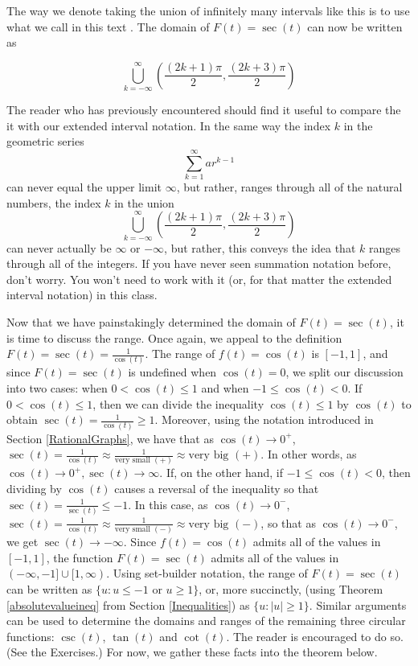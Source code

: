 The way we denote taking the union of infinitely many intervals like this is to use what we call in this text .  The domain of $F(t) = \sec(t)$ can now be written as

\[ \bigcup_{k = -\infty}^{\infty} \left( \frac{(2k+1)\pi}{2}, \frac{(2k+3) \pi}{2} \right) \]

\label{extendedinterval}

The reader who has previously encountered  should find it useful to compare the it with our extended interval notation.  In the same way the index $k$ in the geometric series 
\[\displaystyle{\sum_{k = 1}^{\infty} a r^{k-1}}\] 
can never equal the upper limit $\infty$, but rather, ranges through all of the natural numbers, the index $k$ in the union \[\displaystyle{\bigcup_{k = -\infty}^{\infty} \left( \frac{(2k+1)\pi}{2}, \frac{(2k+3) \pi}{2} \right)}\] can never actually be $\infty$ or $-\infty$, but rather, this conveys the idea that $k$ ranges through all of the integers. If you have never seen summation notation before, don't worry. You won't need to work with it (or, for that matter the extended interval notation) in this class.  

Now that we have painstakingly determined the domain of $F(t) = \sec(t)$, it is time to discuss the range.  Once again, we appeal to the definition $F(t) = \sec(t) = \frac{1}{\cos(t)}$.  The range of $f(t) = \cos(t)$ is $[-1,1]$, and since $F(t) = \sec(t)$ is  undefined when $\cos(t) = 0$, we split our discussion into two cases: when $0 < \cos(t) \leq 1$ and when $-1 \leq \cos(t) < 0$.  If $0 < \cos(t) \leq 1$, then we can divide the inequality $\cos(t) \leq 1$ by  $\cos(t)$ to obtain  $\sec(t) = \frac{1}{\cos(t)} \geq 1$.  Moreover, using the notation introduced in Section \ref{RationalGraphs}, we have that as  $\cos(t) \rightarrow 0^{+}$, $\sec(t)  = \frac{1}{\cos(t)} \approx \frac{1}{\text{very small $(+)$}} \approx \text{very big $(+)$}$.  In other words, as $\cos(t) \rightarrow 0^{+}, \sec(t) \rightarrow \infty$. If, on the other hand, if $-1 \leq \cos(t) < 0$, then dividing by $\cos(t)$ causes a reversal of the inequality so that $\sec(t) = \frac{1}{\sec(t)} \leq -1$.  In this case, as $\cos(t) \rightarrow 0^{-}$, $\sec(t)  = \frac{1}{\cos(t)} \approx \frac{1}{\text{very small $(-)$}} \approx \text{very big $(-)$}$, so that as $\cos(t) \rightarrow 0^{-}$, we get $\sec(t) \rightarrow -\infty$. Since $f(t) = \cos(t)$ admits all of the values in $[-1,1]$, the function $F(t) = \sec(t)$ admits all of the values in $(-\infty, -1] \cup [1,\infty)$.  Using set-builder notation, the range of $F(t) = \sec(t)$ can be written as $\{ u : \text{$u \leq -1$ or $u \geq 1$} \}$, or, more succinctly, (using Theorem \ref{absolutevalueineq} from Section \ref{Inequalities}) as  $\{ u :|u| \geq 1 \}$.   Similar arguments can be used to determine the domains and ranges of the remaining three circular functions: $\csc(t)$, $\tan(t)$ and $\cot(t)$.  The reader is encouraged to do so.  (See the Exercises.)  For now, we gather these facts into the theorem below.

